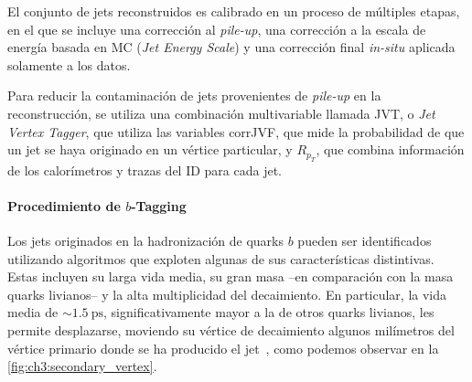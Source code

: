 El conjunto de jets reconstruidos es calibrado en un proceso de múltiples etapas, en el que se incluye una corrección al \textit{pile-up}, una corrección a la escala de energía basada en MC (\textit{Jet Energy Scale}) y una corrección final \textit{in-situ} aplicada solamente a los datos.

Para reducir la contaminación de jets provenientes de \textit{pile-up} en la reconstrucción, se utiliza una combinación multivariable llamada JVT, o \textit{Jet Vertex Tagger}, que utiliza las variables corrJVF, que mide la probabilidad de que un jet se haya originado en un vértice particular, y $R_{p_T}$, que combina información de los calorímetros y trazas del ID para cada jet.


\paragraph{Procedimiento de $b$-Tagging}

Los jets originados en la hadronización de quarks $b$ pueden ser identificados utilizando algoritmos que exploten algunas de sus características distintivas. Estas incluyen su larga vida media, su gran masa --en comparación con la masa quarks livianos-- y la alta multiplicidad del decaimiento. En particular, la vida media de $\sim \SI{1.5}{\pico\second}$, significativamente mayor a la de otros quarks livianos, les permite desplazarse, moviendo su vértice de decaimiento algunos milímetros del vértice primario donde se ha producido el jet~\cite{ATL-PHYS-PUB-2017-013, ATL-PHYS-PUB-2014-014}, como podemos observar en la \cref{fig:ch3:secondary_vertex}.

